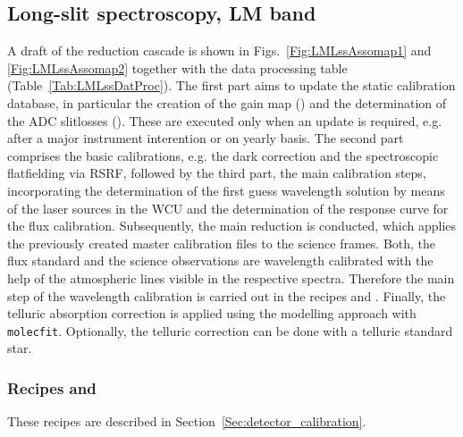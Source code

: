 \clearpage
\subsection{Long-slit spectroscopy, LM band}
\label{ssec:recipes_lss_lm}

A draft of the reduction cascade is shown in
Figs.~\ref{Fig:LMLssAssomap1} and \ref{Fig:LMLssAssomap2} together with the data processing table
(Table~\ref{Tab:LMLssDatProc}). The first part aims to update the static calibration database, in particular the creation of the gain map (\hyperref[Sec:detector_calibration]{}) and the determination of the \ac{ADC} slitlosses (\hyperref[rec:metislmadcmslitloss]{}). These are executed only when an update is required, e.g. after a major instrument interention or on yearly basis. The second part comprises the basic calibrations, e.g. the dark correction and the spectroscopic flatfielding via \ac{RSRF}, followed by the third part, the main calibration steps, incorporating the determination of the first guess wavelength solution by means of the laser sources in the \ac{WCU} and the determination of the response curve for the flux calibration. Subsequently, the main reduction is conducted, which applies the previously created master calibration files to the science frames. Both, the flux standard and the science observations are wavelength calibrated with the help of the atmospheric lines visible in the respective spectra. Therefore the main step of the wavelength calibration is carried out in the recipes \hyperref[rec:lsslmstd]{} and \hyperref[rec:lsslmsci]{}. Finally, the telluric absorption correction is applied using the modelling approach with \texttt{molecfit}. Optionally, the telluric correction can be done with a telluric standard star.


\subsubsection{Recipes  and }
These recipes are described in Section~\ref{Sec:detector_calibration}.

